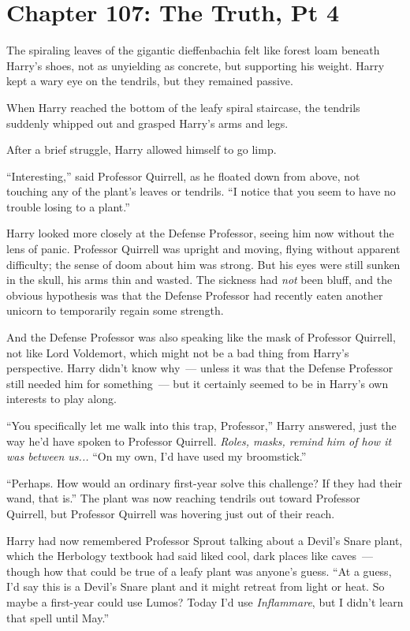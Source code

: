 \chapter{Chapter 107: The Truth, Pt 4}
The spiraling leaves of the gigantic dieffenbachia felt like forest loam beneath Harry's shoes, not as unyielding as concrete, but supporting his weight. Harry kept a wary eye on the tendrils, but they remained passive.

When Harry reached the bottom of the leafy spiral staircase, the tendrils suddenly whipped out and grasped Harry's arms and legs.

After a brief struggle, Harry allowed himself to go limp.

``Interesting,'' said Professor Quirrell, as he floated down from above, not touching any of the plant's leaves or tendrils. ``I notice that you seem to have no trouble losing to a plant.''

Harry looked more closely at the Defense Professor, seeing him now without the lens of panic. Professor Quirrell was upright and moving, flying without apparent difficulty; the sense of doom about him was strong. But his eyes were still sunken in the skull, his arms thin and wasted. The sickness had \emph{not} been bluff, and the obvious hypothesis was that the Defense Professor had recently eaten another unicorn to temporarily regain some strength.

And the Defense Professor was also speaking like the mask of Professor Quirrell, not like Lord Voldemort, which might not be a bad thing from Harry's perspective. Harry didn't know why~--- unless it was that the Defense Professor still needed him for something~--- but it certainly seemed to be in Harry's own interests to play along.

``You specifically let me walk into this trap, Professor,'' Harry answered, just the way he'd have spoken to Professor Quirrell. \emph{Roles, masks, remind him of how it was between us...} ``On my own, I'd have used my broomstick.''

``Perhaps. How would an ordinary first-year solve this challenge? If they had their wand, that is.'' The plant was now reaching tendrils out toward Professor Quirrell, but Professor Quirrell was hovering just out of their reach.

Harry had now remembered Professor Sprout talking about a Devil's Snare plant, which the Herbology textbook had said liked cool, dark places like caves~--- though how that could be true of a leafy plant was anyone's guess. ``At a guess, I'd say this is a Devil's Snare plant and it might retreat from light or heat. So maybe a first-year could use Lumos? Today I'd use \emph{Inflammare}, but I didn't learn that spell until May.''

